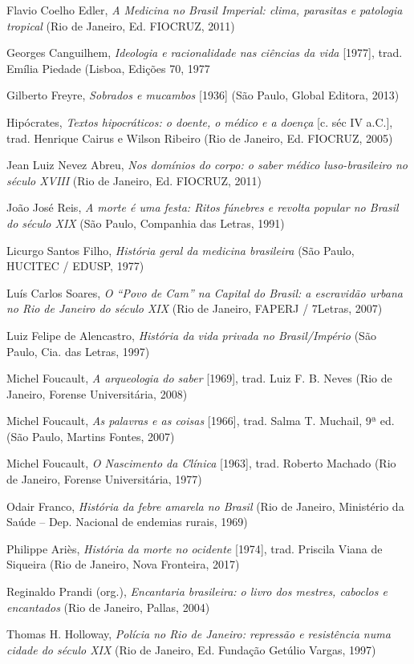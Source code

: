 \documentclass[12pt]{extarticle}
\begin{document}
Flavio Coelho Edler, \emph{A Medicina no Brasil Imperial: clima,
parasitas e patologia tropical} (Rio de Janeiro, Ed. FIOCRUZ, 2011)

Georges Canguilhem, \emph{Ideologia e racionalidade nas ciências da
vida} {[}1977{]}, trad. Emília Piedade (Lisboa, Edições 70, 1977

Gilberto Freyre, \emph{Sobrados e mucambos} {[}1936{]} (São Paulo,
Global Editora, 2013)

Hipócrates, \emph{Textos hipocráticos: o doente, o médico e a doença}
{[}c. séc IV a.C.{]}, trad. Henrique Cairus e Wilson Ribeiro (Rio de
Janeiro, Ed. FIOCRUZ, 2005)

Jean Luiz Nevez Abreu, \emph{Nos domínios do corpo: o saber médico
luso-brasileiro no século XVIII} (Rio de Janeiro, Ed. FIOCRUZ, 2011)

João José Reis, \emph{A morte é uma festa: Ritos fúnebres e revolta
popular no Brasil do século XIX} (São Paulo, Companhia das Letras, 1991)

Licurgo Santos Filho, \emph{História geral da medicina brasileira} (São
Paulo, HUCITEC / EDUSP, 1977)

Luís Carlos Soares, \emph{O ``Povo de Cam'' na Capital do Brasil: a
escravidão urbana no Rio de Janeiro do século XIX} (Rio de Janeiro,
FAPERJ / 7Letras, 2007)

Luiz Felipe de Alencastro, \emph{História da vida privada no
Brasil/Império} (São Paulo, Cia. das Letras, 1997)

Michel Foucault, \emph{A arqueologia do saber} {[}1969{]}, trad. Luiz F.
B. Neves (Rio de Janeiro, Forense Universitária, 2008)

Michel Foucault, \emph{As palavras e as coisas} {[}1966{]}, trad. Salma
T. Muchail, 9ª ed. (São Paulo, Martins Fontes, 2007)

Michel Foucault, \emph{O Nascimento da Clínica} {[}1963{]}, trad.
Roberto Machado (Rio de Janeiro, Forense Universitária, 1977)

Odair Franco, \emph{História da febre amarela no Brasil} (Rio de
Janeiro, Ministério da Saúde -- Dep. Nacional de endemias rurais, 1969)

Philippe Ariès, \emph{História da morte no ocidente} {[}1974{]}, trad.
Priscila Viana de Siqueira (Rio de Janeiro, Nova Fronteira, 2017)

Reginaldo Prandi (org.), \emph{Encantaria brasileira: o livro dos
mestres, caboclos e encantados} (Rio de Janeiro, Pallas, 2004)

Thomas H. Holloway, \emph{Polícia no Rio de Janeiro: repressão e
resistência numa cidade do século XIX} (Rio de Janeiro, Ed. Fundação
Getúlio Vargas, 1997)
\end{document}
